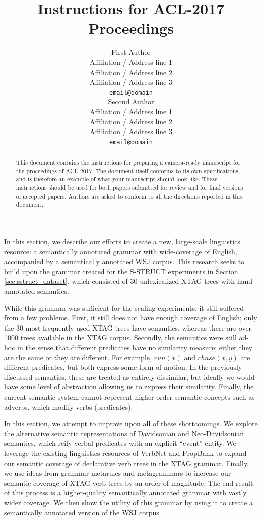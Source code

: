 \documentclass[11pt,a4paper]{article}
\title{Instructions for ACL-2017 Proceedings}
\author{First Author \\
  Affiliation / Address line 1 \\
  Affiliation / Address line 2 \\
  Affiliation / Address line 3 \\
  {\tt email@domain} \\\And
  Second Author \\
  Affiliation / Address line 1 \\
  Affiliation / Address line 2 \\
  Affiliation / Address line 3 \\
  {\tt email@domain} \\}
\date{}
\begin{document}
\maketitle
\begin{abstract}
  This document contains the instructions for preparing a camera-ready
  manuscript for the proceedings of ACL-2017. The document itself
  conforms to its own specifications, and is therefore an example of
  what your manuscript should look like. These instructions should be
  used for both papers submitted for review and for final versions of
  accepted papers.  Authors are asked to conform to all the directions
  reported in this document.
\end{abstract}


In this section, we describe our efforts to create a new, large-scale
linguistics resource: a semantically annotated grammar with wide-coverage of
English, accompanied by a semantically annotated WSJ corpus. This research seeks
to build upon the grammar created for the S-STRUCT experiments in Section
\ref{sec:sstruct_dataset}, which consisted of 30 unlexicalized XTAG trees with
hand-annotated semantics. 

While this grammar was sufficient for the scaling
experiments, it still suffered from a few problems. First, it still does not
have enough coverage of English; only the 30 most frequently used XTAG trees
have semantics, whereas there are over 1000 trees available in the XTAG corpus.
Secondly, the semantics were still ad-hoc in the sense that different predicates
have no similarity measure; either they are the same or they are different. For
example, $run(x)$ and $chase(x,y)$ are different predicates, but both express
some form of motion. In the previously discussed semantics, these are treated as
entirely dissimilar, but ideally we would have some level of abstraction
allowing us to express their similarity. Finally, the current semantic system
cannot represent higher-order semantic concepts such as adverbs, which modify
verbs (predicates).

In this section, we attempt to improve upon all of these shortcomings. We explore the
alternative semantic representations of Davidsonian and Neo-Davidsonian semantics, which
reify verbal predicates with an explicit ``event'' entity. We leverage the existing 
linguistics resources of VerbNet and PropBank to expand our semantic coverage of declarative verb trees in the XTAG grammar. Finally,
we use ideas from grammar metarules and metagrammars to increase our semantic coverage of XTAG verb trees by an order of magnitude. The end result of this process is a higher-quality semantically annotated grammar with vastly wider
coverage. We then show the utility of this grammar by using it to create a semantically annotated version of the WSJ corpus.
\end{document}
